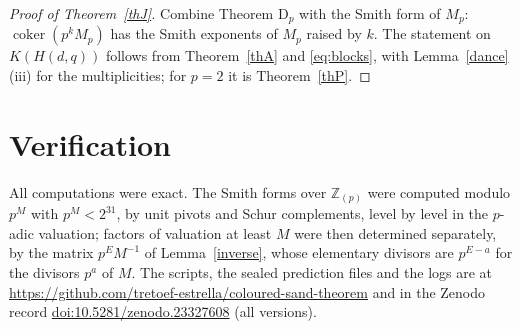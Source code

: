 \documentclass[10pt]{article}
\theoremstyle{ds}
\theoremstyle{dsrem}
\newcommand{\Z}{\mathbb{Z}}
\newcommand{\coker}{\operatorname{coker}}
\begin{document}
\begin{proof}[Proof of Theorem~\ref{thJ}]
Combine Theorem D$_p$ with the Smith form of $M_p$: $\coker(p^kM_p)$ has the Smith exponents of $M_p$ raised by $k$. The statement on $K(H(d,q))$ follows from Theorem~\ref{thA} and \eqref{eq:blocks}, with Lemma~\ref{dance}(iii) for the multiplicities; for $p=2$ it is Theorem~\ref{thP}.
\end{proof}

\section{Verification}\label{sec:ver}

All computations were exact. The Smith forms over $\Z_{(p)}$ were computed modulo $p^M$ with $p^M<2^{31}$, by unit pivots and Schur complements, level by level in the $p$-adic valuation; factors of valuation at least $M$ were then determined separately, by the matrix $p^E M^{-1}$ of Lemma~\ref{inverse}, whose elementary divisors are $p^{E-a}$ for the divisors $p^a$ of $M$. The scripts, the sealed prediction files and the logs are at \url{https://github.com/tretoef-estrella/coloured-sand-theorem} and in the Zenodo record \href{https://doi.org/10.5281/zenodo.23327608}{doi:10.5281/zenodo.23327608} (all versions).
\end{document}
